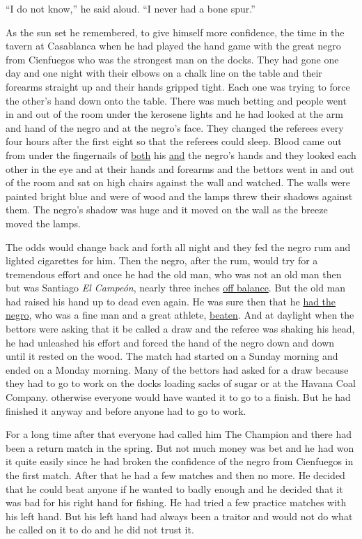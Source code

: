 \documentclass[fontset=ubuntu,zihao=-4]{ctexrep}
\begin{document}
``I do not know,'' he said aloud. ``I never had a bone spur.''

As the sun set he remembered, to give himself more confidence, the time in
the \gls{tavern} at \gls{Casablanca} when he had played the hand game with
the great \gls{negro} from \gls{Cienfuegos} who was the strongest man on the
\glspl{dock}. They had gone one day and one night with their \glspl{elbow}
on a \gls{chalk} line on the table and their forearms straight up and their
hands gripped tight. Each one was trying to force the other's hand down onto
the table. There was much \gls{betting} and people went in and out of the
room under the \gls{kerosene} lights and he had looked at the arm and hand
of the negro and at the negro's face. They changed the \glspl{referee} every
four hours after the first eight so that the referees could sleep. Blood
came out from under the \glspl{fingernail} of \uline{both} his \uline{and}
the negro's hands and they looked each other in the eye and at their hands
and forearms and the \glspl{bettor} went in and out of the room and sat on
high chairs against the wall and watched. The walls were painted bright blue
and were of wood and the lamps \gls{threw} their shadows against them. The
negro's shadow was huge and it moved on the wall as the breeze moved the
lamps.

The \gls{odds} would change back and \gls{forth} all night and they fed the
negro \gls{rum} and lighted cigarettes for him. Then the negro, after the
rum, would try for a \gls{tremendous} effort and once he had the old man,
who was not an old man then but was Santiago \emph{El Campeón}, nearly
three inches \uline{off balance}. But the old man had raised his hand up to
dead even again. He was sure then that he \uline{had the negro}, who was a
fine man and a great \gls{athlete}, \uline{beaten}. And at daylight when the
bettors were asking that it be called a draw and the referee was shaking his
head, he had unleashed his effort and forced the hand of the negro down and
down until it rested on the wood. The match had started on a Sunday morning
and ended on a Monday morning. Many of the bettors had asked for a draw
because they had to go to work on the docks \gls{loading} sacks of sugar or
at the Havana Coal Company. \Gls{otherwise} everyone would have wanted it to
go to a finish. But he had finished it anyway and before anyone had to go to
work.

For a long time after that everyone had called him The Champion and there
had been a return match in the spring. But not much money was bet and he had
won it quite easily since he had broken the confidence of the negro from
Cienfuegos in the first match. After that he had a few matches and then no
more. He decided that he could beat anyone if he wanted to \gls{badly}
enough and he decided that it was bad for his right hand for fishing. He had
tried a few practice matches with his left hand. But his left hand had
always been a \gls{traitor} and would not do what he called on it to do and
he did not trust it.
\end{document}
